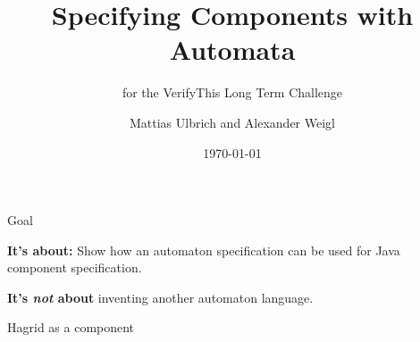 \documentclass[navbaroff,4:3]{kitbeamer}
\title{Specifying Components with Automata}
\subtitle{for the VerifyThis Long Term Challenge}
\author{Mattias Ulbrich and Alexander Weigl}
\date[]{\today}
\newcommand{\kit}[1]{\textcolor{kit-green100}{#1}}
\newcommand{\kitbf}[1]{\kit{\bf #1}}
\begin{document}

\begin{frame}{Goal}

  \large

  \kitbf{It's about:} Show how an automaton specification can be used for Java
  component specification.

  \vfill

  \kitbf{It's \emph{not} about} inventing another automaton language.
  
\end{frame}

\begin{frame}[fragile]{Hagrid as a component}

    
    
    
    
    
    
    
    
    
    
    


\end{frame}
\end{document}
